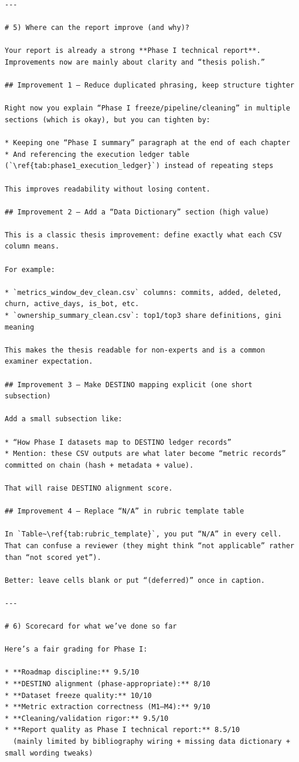 \documentclass[11pt,a4paper]{article}
\begin{document}
\begin{verbatim}
---

# 5) Where can the report improve (and why)?

Your report is already a strong **Phase I technical report**. Improvements now are mainly about clarity and “thesis polish.”

## Improvement 1 — Reduce duplicated phrasing, keep structure tighter

Right now you explain “Phase I freeze/pipeline/cleaning” in multiple sections (which is okay), but you can tighten by:

* Keeping one “Phase I summary” paragraph at the end of each chapter
* And referencing the execution ledger table (`\ref{tab:phase1_execution_ledger}`) instead of repeating steps

This improves readability without losing content.

## Improvement 2 — Add a “Data Dictionary” section (high value)

This is a classic thesis improvement: define exactly what each CSV column means.

For example:

* `metrics_window_dev_clean.csv` columns: commits, added, deleted, churn, active_days, is_bot, etc.
* `ownership_summary_clean.csv`: top1/top3 share definitions, gini meaning

This makes the thesis readable for non-experts and is a common examiner expectation.

## Improvement 3 — Make DESTINO mapping explicit (one short subsection)

Add a small subsection like:

* “How Phase I datasets map to DESTINO ledger records”
* Mention: these CSV outputs are what later become “metric records” committed on chain (hash + metadata + value).

That will raise DESTINO alignment score.

## Improvement 4 — Replace “N/A” in rubric template table

In `Table~\ref{tab:rubric_template}`, you put “N/A” in every cell.
That can confuse a reviewer (they might think “not applicable” rather than “not scored yet”).

Better: leave cells blank or put “(deferred)” once in caption.

---

# 6) Scorecard for what we’ve done so far

Here’s a fair grading for Phase I:

* **Roadmap discipline:** 9.5/10
* **DESTINO alignment (phase-appropriate):** 8/10
* **Dataset freeze quality:** 10/10
* **Metric extraction correctness (M1–M4):** 9/10
* **Cleaning/validation rigor:** 9.5/10
* **Report quality as Phase I technical report:** 8.5/10
  (mainly limited by bibliography wiring + missing data dictionary + small wording tweaks)


\end{verbatim}
\end{document}

